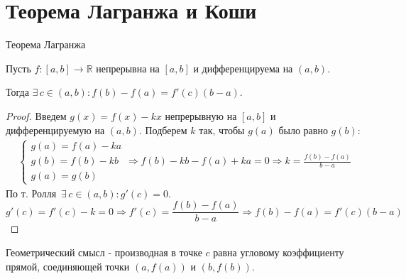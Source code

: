 \section{Теорема Лагранжа и Коши \href{https://youtu.be/OXDjegAsmSU?t=5760}{\Walley}}
\begin{theorem-non}
    Теорема Лагранжа

    Пусть $f: [a, b] \to \mathbb{R}$ непрерывна на $[a, b]$ и дифференцируема на $(a, b)$.

    Тогда $\exists \, c \in (a, b) : f(b) - f(a) = f'(c)(b - a)$.
\end{theorem-non}
\begin{proof}
    Введем $g(x) = f(x) - kx$ непрерывную на $[a, b]$ и дифференцируемую на $(a, b)$. Подберем $k$ так, чтобы $g(a)$ было равно $g(b)$:
    \begin{gather*}
        \begin{cases}
            g(a) = f(a) - ka \\
            g(b) = f(b) - kb \\
            g(a) = g(b)
        \end{cases} 
        \Rightarrow f(b) - kb - f(a) + ka = 0 \Rightarrow k = \frac{f(b) - f(a)}{b - a}
    \end{gather*}
    По т. Ролля $ \, \exists \, c \in (a, b) : g'(c) = 0$.
    \[ g'(c) = f'(c) - k = 0 \Rightarrow f'(c) = \frac{f(b) - f(a)}{b - a} \Rightarrow f(b) - f(a) = f'(c)(b - a) \]
\end{proof}
\begin{notice}
     Геометрический смысл - производная в точке $c$ равна угловому коэффициенту прямой, 
     соединяющей точки $(a, f(a))$ и $(b, f(b))$.
\end{notice}


